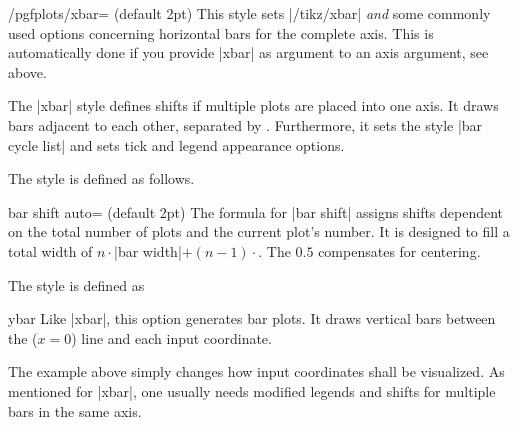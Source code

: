 {\begin{stylekey}{/pgfplots/xbar= (default 2pt)}
	This style sets |/tikz/xbar| \emph{and} some commonly used options concerning horizontal bars for the complete axis. This is automatically done if you provide |xbar| as argument to an axis argument, see above.

The |xbar| style defines shifts if multiple plots are placed into one axis. It draws bars adjacent to each other, separated by . Furthermore, it sets the style |bar cycle list| and sets tick and legend appearance options.

The style is defined as follows.
\begin{codeexample}
\end{codeexample}
	\begin{pgfplotskey}{bar shift auto= (default 2pt)}
The formula for |bar shift| assigns shifts dependent on the total number of plots and the current plot's number. It is designed to fill a total width of $n \cdot $|bar width|$ + (n-1) \cdot $. The $0.5$ compensates for centering.
	
	The style is defined as
\begin{codeexample}
\end{codeexample}
		
	\end{pgfplotskey}
\end{stylekey}

\begin{plottype}{ybar}
	Like |xbar|, this option generates bar plots. It draws vertical bars between the ($x=0$) line and each input coordinate.
\begin{codeexample}[]
\end{codeexample}
	The example above simply changes how input coordinates shall be visualized. As mentioned for |xbar|, one usually needs modified legends and shifts for multiple bars in the same axis.


\end{plottype}}
